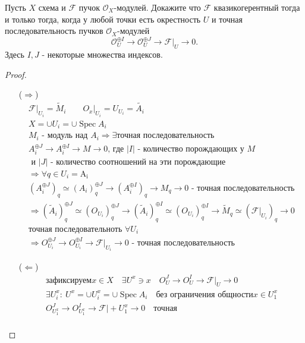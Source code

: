 \begin{prob}
Пусть $X$ схема и $\mathcal{F}$ пучок $\mathcal{O}_X$-модулей. Докажите что $\mathcal{F}$ квазикогерентный тогда и только тогда, когда у любой точки есть окрестность $U$ и точная последовательность пучков $\mathcal{O}_X$-модулей
$$
\mathcal{O}_U^{\oplus I} \rightarrow \mathcal{O}_U^{\oplus J} \rightarrow \mathcal{F}\big|_U \rightarrow 0 .
$$
Здесь $I, J$ - некоторые множества индексов.
\end{prob}
\begin{proof}
\begin{itemize}
\item[]
\item[($\Rightarrow$)]
\begin{gather*}
    \mathcal{F}\big|_{U_i} = \tilde{M}_i\qquad
    O_x \big|_{U_i} = U_{U_i} = \tilde{A_i}\\
    X = \cup U_i = \cup \operatorname{Spec} A_i\\
    M_i \text{ - модуль над } A_i \Rightarrow
    \exists \text{точная последовательность}\\
    A_i^{\oplus J} \to A_i^{\oplus I} \to M \to 0
    \text{, где } |I| \text{ - количество порождающих у } M\\ \text{ и } |J| \text{ - количество соотношений на эти порождающие}\\
    \Rightarrow \forall q \in U_i = \operatorname{A_i}\\
    (A_i^{\oplus J})_q \simeq (A_i)^{\oplus J}_q \to (A_i^{\oplus I})_q \to M_q \to 0 \text{ - точная последовательность}\\
    \Rightarrow (\tilde{A}_i)^{\oplus J}_q \simeq  (O_{U_i})^{\oplus J}_q \to (\tilde{A}_i)^{\oplus I}_q \simeq (O_{U_i})^{\oplus I}_q \to \tilde{M}_q \simeq (\mathcal{F}\big|_{U_i})_q \to 0\\
    \text{точная последовательноть } \forall U_i\\
    \Rightarrow O_{U_i}^{\oplus J} \to O_{U_i}^{\oplus I} \to \mathcal{F}\big|_{U_i} \to 0 \text{ - точная последовательность}
\end{gather*}
\item[($\Leftarrow$)]
\begin{gather*}
    \text{зафиксируем} x \in X
    \quad \exists U^x \ni x
    \quad O^J_U \to O^I_U \to \mathcal{F}\big|_U \to 0\\
    \exists U^x_i:\ U^x = \cup U_i^x = \cup \operatorname{Spec} A_i\quad \text{без ограничения общности} x \in U^x_1\\
    O^J_{U^x_1} \to O^I_{U^x_1} \to \mathcal{F}\big|+{U^x_1} \to 0\quad \text{точная}\\

\end{gather*}
\end{itemize}
\end{proof}
